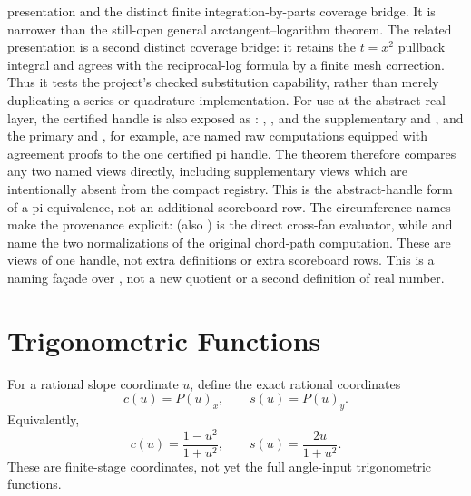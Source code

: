 \begin{theorem}
 presentation and the distinct finite
integration-by-parts coverage bridge.  It is narrower than the still-open
general arctangent--logarithm theorem.
The related  presentation is a second distinct
coverage bridge: it retains the \(t=x^2\) pullback integral and agrees with
the reciprocal-log formula by a finite mesh correction.  Thus it tests the
project's checked substitution capability, rather than merely duplicating a
series or quadrature implementation.
For use at the abstract-real layer, the certified handle is also exposed as
: , , and the
supplementary  and
, and the primary
 and , for
example, are named raw computations
equipped with agreement proofs to the one certified pi handle.
The theorem  therefore compares any two
named  views directly, including supplementary
views which are intentionally absent from the compact
 registry.  This is the abstract-handle form of a pi
equivalence, not an additional scoreboard row.
The circumference names make the provenance explicit:
 (also ) is the direct
cross-fan evaluator, while  and
 name the two normalizations of the original
chord-path computation.  These are views of one handle, not extra definitions
or extra scoreboard rows.
This is a naming façade over , not a new quotient or a second
definition of real number.
\end{theorem}

\section{Trigonometric Functions}

\begin{definition}
\label{def:rational-circle-sin-cos}
For a rational slope coordinate \(u\), define the exact rational coordinates
\[
  c(u)=P(u)_x,\qquad s(u)=P(u)_y.
\]
Equivalently,
\[
  c(u)=\frac{1-u^2}{1+u^2},
  \qquad
  s(u)=\frac{2u}{1+u^2}.
\]
These are finite-stage coordinates, not yet the full angle-input
trigonometric functions.
\end{definition}


